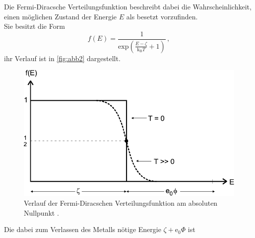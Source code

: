 Die Fermi-Diracsche Verteilungsfunktion beschreibt dabei die Wahrscheinlichkeit,
einen möglichen Zustand der Energie $E$ als besetzt vorzufinden. \\
Sie besitzt die Form
\begin{equation}
    f(E) = \dfrac{1}{\text{exp}(\frac{E - \zeta}{\text{k}_\text{B} T} + 1)} \,,
\end{equation}
ihr Verlauf ist in \autoref{fig:abb2} dargestellt.

\begin{figure}
    \centering
    \includegraphics{figures/Abb2.pdf}
    \caption{Verlauf der Fermi-Diracschen Verteilungsfunktion am absoluten Nullpunkt \cite{ap09}.}
    \label{fig:abb2}
\end{figure}

Die dabei zum Verlassen des Metalls nötige Energie $\zeta + \text{e}_0 \Phi$
ist